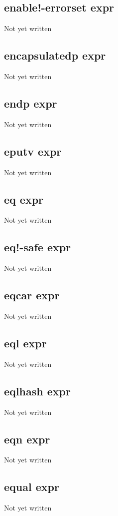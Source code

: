 \documentclass[a4paper,11pt]{article}
\begin{document}
{\subsection{\ttfamily enable!-errorset expr}
Not yet written

\subsection{\ttfamily encapsulatedp expr}
Not yet written

\subsection{\ttfamily endp expr}
Not yet written

\subsection{\ttfamily eputv expr}
Not yet written

\subsection{\ttfamily eq expr}
Not yet written

\subsection{\ttfamily eq!-safe expr}
Not yet written

\subsection{\ttfamily eqcar expr}
Not yet written

\subsection{\ttfamily eql expr}
Not yet written

\subsection{\ttfamily eqlhash expr}
Not yet written

\subsection{\ttfamily eqn expr}
Not yet written

\subsection{\ttfamily equal expr}
Not yet written

}
\end{document}
